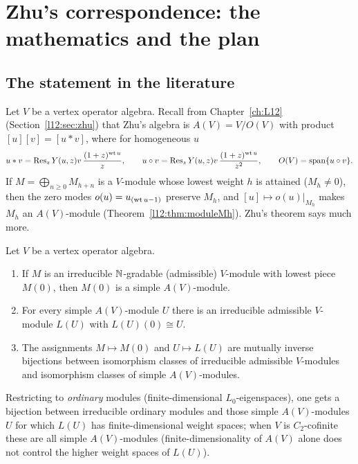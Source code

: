 \section{Zhu's correspondence: the mathematics and the plan}\label{l13:sec:plan}

\subsection{The statement in the literature}

Let $V$ be a vertex operator algebra. Recall from Chapter~\ref{ch:L12} (Section~\ref{l12:sec:zhu}) that Zhu's algebra is
$A(V) = V/O(V)$ with product $[u][v] = [u*v]$, where for homogeneous $u$
\begin{equation*}
 u*v = \operatorname{Res}_z Y(u,z)v\,\frac{(1+z)^{\operatorname{wt} u}}{z},\qquad u\circ v = \operatorname{Res}_z Y(u,z)v\,\frac{(1+z)^{\operatorname{wt} u}}{z^{2}},
 \qquad O(V) = \operatorname{span}\{u\circ v\}.
\end{equation*}
If $M = \bigoplus_{n\ge0}M_{h+n}$ is a $V$-module whose lowest weight $h$ is attained ($M_h\neq0$), then the zero modes
$o(u) = u_{(\operatorname{wt} u-1)}$ preserve $M_h$, and $[u]\mapsto o(u)|_{M_h}$ makes $M_h$ an $A(V)$-module
(Theorem~\ref{l12:thm:moduleMh}). Zhu's theorem says much more.

\begin{theorem}\label{l13:thm:zhu-lit}
Let $V$ be a vertex operator algebra.
\begin{enumerate}
\item If $M$ is an irreducible ${\mathbb{N}}$-gradable (admissible) $V$-module with lowest piece $M(0)$, then $M(0)$ is a simple
  $A(V)$-module.
\item For every simple $A(V)$-module $U$ there is an irreducible admissible $V$-module $L(U)$ with $L(U)(0)\cong U$.
\item The assignments $M\mapsto M(0)$ and $U\mapsto L(U)$ are mutually inverse bijections between isomorphism classes
  of irreducible admissible $V$-modules and isomorphism classes of simple $A(V)$-modules.
\end{enumerate}
\end{theorem}
Restricting to \emph{ordinary} modules (finite-dimensional $L_0$-eigenspaces), one gets a bijection between irreducible
ordinary modules and those simple $A(V)$-modules $U$ for which $L(U)$ has finite-dimensional weight spaces; when $V$
is $C_2$-cofinite these are all simple $A(V)$-modules (finite-dimensionality of $A(V)$ alone does not control the higher
weight spaces of $L(U)$).

